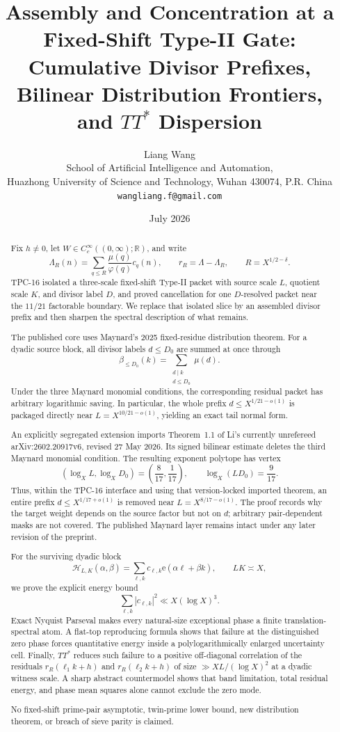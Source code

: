 \documentclass[11pt]{article}
\title{\textbf{Assembly and Concentration at a Fixed-Shift Type-II Gate:}\\
\textbf{Cumulative Divisor Prefixes, Bilinear Distribution Frontiers,}\\
\textbf{and \texorpdfstring{$TT^*$}{TT*} Dispersion}}
\author{Liang Wang\\
\small School of Artificial Intelligence and Automation,\\[-0.2em]
\small Huazhong University of Science and Technology, Wuhan 430074, P.R. China\\
\small \texttt{wangliang.f@gmail.com}}
\date{July 2026}
\theoremstyle{definition}
\theoremstyle{remark}
\newcommand{\R}{\mathbb R}
\newcommand{\cH}{\mathcal H}
\newcommand{\e}{\mathrm e}
\begin{document}
\maketitle

\begin{abstract}
Fix $h\ne0$, let $W\in C_c^\infty((0,\infty);\R)$, and write
\[
 \Lambda_R(n)=\sum_{q\le R}\frac{\mu(q)}{\varphi(q)}c_q(n),
 \qquad r_R=\Lambda-\Lambda_R,
 \qquad R=X^{1/2-\delta}.
\]
TPC-16 isolated a three-scale fixed-shift Type-II packet with source
scale $L$, quotient scale $K$, and divisor label $D$, and proved
cancellation for one $D$-resolved packet near the $11/21$ factorable
boundary.  We replace that isolated slice by an assembled divisor
prefix and then sharpen the spectral description of what remains.

The published core uses Maynard's 2025 fixed-residue distribution
theorem.  For a dyadic source block, all divisor labels $d\le D_0$ are
summed at once through
\[
 \beta_{\le D_0}(k)=\sum_{\substack{d\mid k\\d\le D_0}}\mu(d).
\]
Under the three Maynard monomial conditions, the corresponding residual
packet has arbitrary logarithmic saving.  In particular, the whole prefix
$d\le X^{1/21-o(1)}$ is packaged directly near
$L=X^{10/21-o(1)}$, yielding an exact tail normal form.

An explicitly segregated extension imports Theorem~1.1 of Li's
currently unrefereed arXiv:2602.20917v6, revised 27 May 2026.  Its
signed bilinear estimate deletes the third Maynard monomial condition.
The resulting exponent polytope has vertex
\[
 (\log_XL,\log_XD_0)=\left(\frac8{17},\frac1{17}\right),
 \qquad \log_X(LD_0)=\frac9{17}.
\]
Thus, within the TPC-16 interface and using that version-locked imported
theorem, an entire prefix $d\le X^{1/17+o(1)}$ is removed near
$L=X^{8/17-o(1)}$.  The proof records why the target weight depends on
the source factor but not on $d$; arbitrary pair-dependent masks are
not covered.  The published Maynard layer remains intact under any
later revision of the preprint.

For the surviving dyadic block
\[
 \cH_{L,K}(\alpha,\beta)
 =\sum_{\ell,k}c_{\ell,k}\e(\alpha\ell+\beta k),
 \qquad LK\asymp X,
\]
we prove the explicit energy bound
\[
 \sum_{\ell,k}|c_{\ell,k}|^2\ll X(\log X)^3.
\]
Exact Nyquist Parseval makes every natural-size exceptional phase a
finite translation-spectral atom.  A flat-top reproducing formula shows
that failure at the distinguished zero phase forces quantitative energy
inside a polylogarithmically enlarged uncertainty cell.  Finally,
$TT^*$ reduces such failure to a positive off-diagonal correlation of
the residuals $r_R(\ell_1k+h)$ and $r_R(\ell_2k+h)$ of size
$\gg XL/(\log X)^2$ at a dyadic witness scale.  A sharp abstract
countermodel shows that band limitation, total residual energy, and
phase mean squares alone cannot exclude the zero mode.

No fixed-shift prime-pair asymptotic, twin-prime lower bound, new
distribution theorem, or breach of sieve parity is claimed.
\end{abstract}
\end{document}
